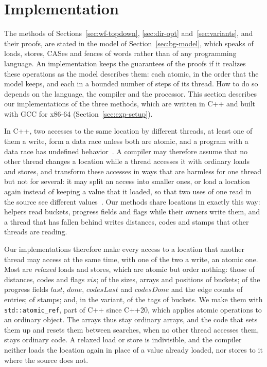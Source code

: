 \section{Implementation}
\label{sec:impl}

The methods of Sections~\ref{sec:wf-topdown}, \ref{sec:dir-opt} and~\ref{sec:variants}, and their proofs, are stated in the model of Section~\ref{sec:bg-model}, which speaks of loads, stores, CASes and fences of words rather than of any programming language. An implementation keeps the guarantees of the proofs if it realizes these operations as the model describes them: each atomic, in the order that the model keeps, and each in a bounded number of steps of its thread. How to do so depends on the language, the compiler and the processor. This section describes our implementations of the three methods, which are written in C++ and built with GCC for x86-64 (Section~\ref{sec:exp-setup}).

In C++, two accesses to the same location by different threads, at least one of them a write, form a data race unless both are atomic, and a program with a data race has undefined behavior~\cite{boehm_cpp}. A compiler may therefore assume that no other thread changes a location while a thread accesses it with ordinary loads and stores, and transform these accesses in ways that are harmless for one thread but not for several: it may split an access into smaller ones, or load a location again instead of keeping a value that it loaded, so that two uses of one read in the source see different values~\cite{boehm_benign}. Our methods share locations in exactly this way: helpers read buckets, progress fields and flags while their owners write them, and a thread that has fallen behind writes distances, codes and stamps that other threads are reading.

Our implementations therefore make every access to a location that another thread may access at the same time, with one of the two a write, an atomic one. Most are \emph{relaxed} loads and stores, which are atomic but order nothing: those of distances, codes and flags $\mathit{vis}$; of the sizes, arrays and positions of buckets; of the progress fields $\mathit{last}$, $\mathit{done}$, $\mathit{codesLast}$ and $\mathit{codesDone}$ and the edge counts of entries; of stamps; and, in the variant, of the tags of buckets. We make them with \texttt{std::atomic\_ref}, part of C++ since C++20, which applies atomic operations to an ordinary object. The arrays thus stay ordinary arrays, and the code that sets them up and resets them between searches, when no other thread accesses them, stays ordinary code. A relaxed load or store is indivisible, and the compiler neither loads the location again in place of a value already loaded, nor stores to it where the source does not.

